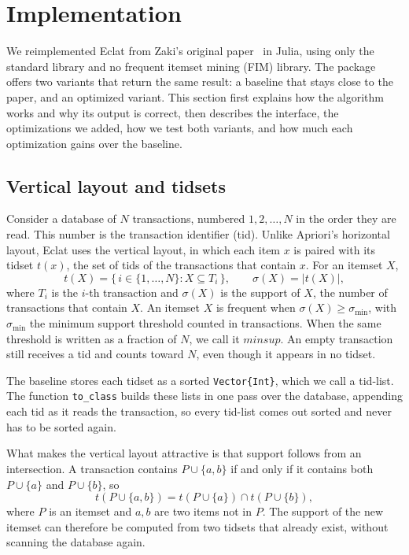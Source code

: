 \section{Implementation}
\label{sec:implementation}
We reimplemented Eclat from Zaki's original paper~\cite{zaki2000} in Julia, using only
the standard library and no frequent itemset mining (FIM) library. The package offers two
variants that return the same result: a baseline that stays close to the paper, and an
optimized variant. This section first explains how the algorithm works and why its output
is correct, then describes the interface, the optimizations we added, how we test both
variants, and how much each optimization gains over the baseline.

\subsection{Vertical layout and tidsets}
\label{sec:vertical}
Consider a database of $N$ transactions, numbered $1, 2, \dots, N$ in the order they are
read. This number is the transaction identifier (tid). Unlike Apriori's horizontal
layout, Eclat uses the vertical layout, in which each item $x$ is paired with its tidset
$t(x)$, the set of tids of the transactions that contain $x$. For an itemset $X$,
\begin{equation}
  t(X) = \{\, i \in \{1,\dots,N\} : X \subseteq T_i \,\}, \qquad
  \sigma(X) = |t(X)|,
  \label{eq:support}
\end{equation}
where $T_i$ is the $i$-th transaction and $\sigma(X)$ is the support of $X$, the number
of transactions that contain $X$. An itemset $X$ is frequent when
$\sigma(X) \ge \sigma_{\min}$, with $\sigma_{\min}$ the minimum support threshold
counted in transactions. When the same threshold is written as a fraction of $N$, we call
it $\mathit{minsup}$. An empty transaction still receives a tid and counts toward $N$,
even though it appears in no tidset.

The baseline stores each tidset as a sorted \texttt{Vector\{Int\}}, which we call a
tid-list. The function \texttt{to\_class} builds these lists in one pass over the
database, appending each tid as it reads the transaction, so every tid-list comes out
sorted and never has to be sorted again.

What makes the vertical layout attractive is that support follows from an intersection.
A transaction contains
$P \cup \{a, b\}$ if and only if it contains both $P \cup \{a\}$ and $P \cup \{b\}$, so
\begin{equation}
  t(P \cup \{a, b\}) = t(P \cup \{a\}) \cap t(P \cup \{b\}),
  \label{eq:intersect}
\end{equation}
where $P$ is an itemset and $a, b$ are two items not in $P$. The support of the new
itemset can therefore be computed from two tidsets that already exist, without scanning
the database again.

